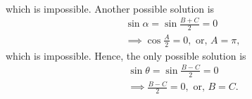 \begin{enumerate}[label=\thesubsection.\arabic*.,ref=\thesubsection.\theenumi]
\begin{align}
\end{align}
which is impossible.  Another possible solution is 
\begin{align}
	\sin \alpha = \sin \frac{B+C}{2} = 0
	\\
	\implies \cos \frac{A}{2} = 0, \text{ or, }
	A = \pi, 
\end{align}
which is impossible.  Hence, the only possible solution is
\begin{align}
	\sin \theta = \sin \frac{B-C}{2} = 0
	\\
	\implies \frac{B-C}{2} =0, \text{ or, }
	B = C.
\end{align}
\end{enumerate}
